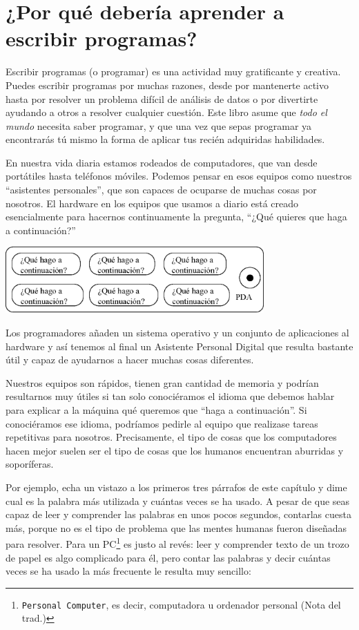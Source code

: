 
\chapter{¿Por qué debería aprender a escribir programas?}

Escribir programas (o programar) es una actividad muy
gratificante y creativa. Puedes escribir programas por
muchas razones, desde por mantenerte activo hasta
por resolver un problema difícil de análisis de datos o
por divertirte ayudando a otros a resolver cualquier cuestión.
Este libro asume que \emph{todo el mundo} necesita saber programar,
y que una vez que sepas programar ya encontrarás tú mismo
la forma de aplicar tus recién adquiridas habilidades.

En nuestra vida diaria estamos rodeados de computadores, que van
desde portátiles hasta teléfonos móviles. Podemos pensar en esos
equipos como nuestros ``asistentes personales'', que son capaces de
ocuparse de muchas cosas por nosotros. El hardware en los equipos
que usamos a diario está creado esencialmente para hacernos
continuamente la pregunta,
``¿Qué quieres que haga a continuación?''

\beforefig
\centerline{\includegraphics[height=1.00in]{figs2/pda.eps}}
\afterfig

Los programadores añaden un sistema operativo y un conjunto de
aplicaciones al hardware y así tenemos al final un Asistente Personal
Digital que resulta bastante útil y capaz de ayudarnos a hacer
muchas cosas diferentes.

Nuestros equipos son rápidos, tienen gran cantidad de memoria
y podrían resultarnos muy útiles si tan solo conociéramos el idioma
que debemos hablar para explicar a la máquina qué queremos que
``haga a continuación''. Si conociéramos ese idioma, podríamos pedirle al
equipo que realizase tareas repetitivas para nosotros. 
Precisamente, el tipo de cosas que los computadores hacen mejor
suelen ser el tipo de cosas que los humanos encuentran aburridas
y soporíferas.

Por ejemplo, echa un vistazo a los primeros tres párrafos de este
capítulo y dime cual es la palabra más utilizada y cuántas veces
se ha usado. A pesar de que seas capaz de leer y comprender
las palabras en unos pocos segundos, contarlas cuesta más,
porque no es el tipo de problema que las mentes humanas
fueron diseñadas para resolver. Para un
PC\footnote{{\tt Personal Computer}, es decir, computadora u ordenador personal (Nota del trad.)}
es justo al revés: leer y comprender texto
de un trozo de papel es algo complicado para él,
pero contar las palabras y decir cuántas veces
se ha usado la más frecuente le resulta muy sencillo:

